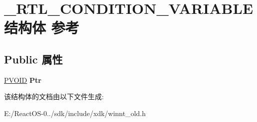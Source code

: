 \hypertarget{struct___r_t_l___c_o_n_d_i_t_i_o_n___v_a_r_i_a_b_l_e}{}\section{\+\_\+\+R\+T\+L\+\_\+\+C\+O\+N\+D\+I\+T\+I\+O\+N\+\_\+\+V\+A\+R\+I\+A\+B\+L\+E结构体 参考}
\label{struct___r_t_l___c_o_n_d_i_t_i_o_n___v_a_r_i_a_b_l_e}
\subsection*{Public 属性}
\begin{DoxyCompactItemize}
\item 
\mbox{\label{struct___r_t_l___c_o_n_d_i_t_i_o_n___v_a_r_i_a_b_l_e_ac2e8371b75348d191bd533ddc9150fcd}} 
\hyperlink{interfacevoid}{P\+V\+O\+ID} {\bfseries Ptr}
\end{DoxyCompactItemize}


该结构体的文档由以下文件生成\+:\begin{DoxyCompactItemize}
\item 
E\+:/\+React\+O\+S-\/0../sdk/include/xdk/winnt\+\_\+old.\+h\end{DoxyCompactItemize}
